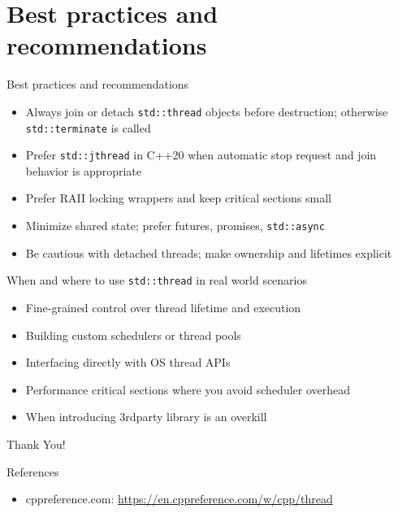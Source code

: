 \documentclass{beamer}
\begin{document}
\section{Best practices and recommendations}

\begin{frame}{Best practices and recommendations}
  \begin{itemize}
    \item Always join or detach \texttt{std::thread} objects before destruction; otherwise \texttt{std::terminate} is called
    \item Prefer \texttt{std::jthread} in C++20 when automatic stop request and join behavior is appropriate
    \item Prefer RAII locking wrappers and keep critical sections small
    \item Minimize shared state; prefer futures, promises, \texttt{std::async}
    \item Be cautious with detached threads; make ownership and lifetimes explicit
  \end{itemize}
\end{frame}

\begin{frame}{When and where to use \texttt{std::thread} in real world scenarios}
  \begin{itemize}
    \item Fine-grained control over thread lifetime and execution
    \item Building custom schedulers or thread pools
    \item Interfacing directly with OS thread APIs
    \item Performance critical sections where you avoid scheduler overhead
    \item When introducing 3rdparty library is an overkill
  \end{itemize}
\end{frame}

\begin{frame}
  \centering
  \Huge{Thank You!}
\end{frame}

\begin{frame}{References}
  \begin{itemize}
    \item cppreference.com: \url{https://en.cppreference.com/w/cpp/thread}
  \end{itemize}
\end{frame}
\end{document}
